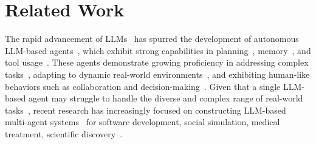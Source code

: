 \documentclass{article}
\begin{document}
\section{Related Work}
The rapid advancement of LLMs~\cite{wei2022emergent,NEURIPS2020_1457c0d6,radford2019language,kaplan2020scaling,10.5555/3600270.3602532, bubeck2023sparks} has spurred the development of autonomous LLM-based agents~\cite{weng2023agent, AutoGPT,park2023generative,li2024camel,wu2024autogen,sumers2023cognitive}, which exhibit strong capabilities in planning~\cite{wang2024promptagent,hao2023reasoninglanguagemodelplanning,hu2024uncertainty}, memory~\cite{park2023generative, hua2023war,modarressi2024retllmgeneralreadwritememory}, and tool usage~\cite{schick2023toolformer,qin2023toolllm,cai2023large,GPT4Tools}. These agents demonstrate growing proficiency in addressing complex tasks~\cite{ge2023openagillmmeetsdomain,zhang2024generativeagentsrecommendation,qian2024chatdevcommunicativeagentssoftware,Hager2024Evaluation,valmeekam2023on}, adapting to dynamic real-world environments~\cite{zhou2024webarenarealisticwebenvironment,ma2023laser,zhou2023agentsopensourceframeworkautonomous}, and exhibiting human-like behaviors such as collaboration and decision-making~\cite{chen2023introspectivetipslargelanguage,park2023generative, Shanahan2023}.
Given that a single LLM-based agent may struggle to handle the diverse and complex range of real-world tasks~\cite{du2023improvingfactualityreasoninglanguage,li2024camel,wang2023voyager}, recent research has increasingly focused on constructing LLM-based multi-agent systems~\cite{chen2023agentverse,qian2024chatdevcommunicativeagentssoftware,hong2023metagpt,tang2023medagents,chen2025internet} for software development\cite{qian2024chatdevcommunicativeagentssoftware, hong2023metagpt}, social simulation\cite{park2023generative,hua2023war}, medical treatment\cite{tang2023medagents,li2024agent}, scientific discovery~\cite{zeng2023interactivemoleculardiscoverynatural}.
\end{document}
